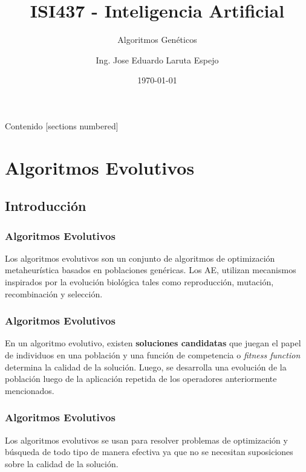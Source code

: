 \documentclass[10pt]{beamer}
\title{ISI437 - Inteligencia Artificial}
\subtitle{Algoritmos Genéticos}
\date{\today}
\author{Ing. Jose Eduardo Laruta Espejo}
\institute{Universidad La Salle - Bolivia}
\begin{document}
\maketitle

\begin{frame}[allowframebreaks]{Contenido}
  [sections numbered]
  \tableofcontents[]
\end{frame}


\section{Algoritmos Evolutivos}
\subsection{Introducción}
\begin{frame}
  \frametitle{Algoritmos Evolutivos}

  Los algoritmos evolutivos son un conjunto de algoritmos de optimización
  metaheurística basados en poblaciones genéricas. Los AE, utilizan mecanismos 
  inspirados por la \alert{evolución biológica} tales como reproducción, 
  mutación, recombinación y selección.
  
\end{frame}

\begin{frame}
  \frametitle{Algoritmos Evolutivos}

  En un algoritmo evolutivo, existen \textbf{soluciones candidatas} que 
  juegan el papel de individuos en una población y una \alert{función de competencia} 
  o \textit{fitness function} determina la calidad de la solución. Luego, se desarrolla
  una evolución de la población luego de la aplicación repetida de los operadores 
  anteriormente mencionados.
  
\end{frame}

\begin{frame}
  \frametitle{Algoritmos Evolutivos}

  Los algoritmos evolutivos se usan para resolver problemas de optimización y búsqueda 
  de todo tipo de manera efectiva ya que no se necesitan suposiciones sobre la calidad 
  de la solución.
  
\end{frame}
\end{document}

